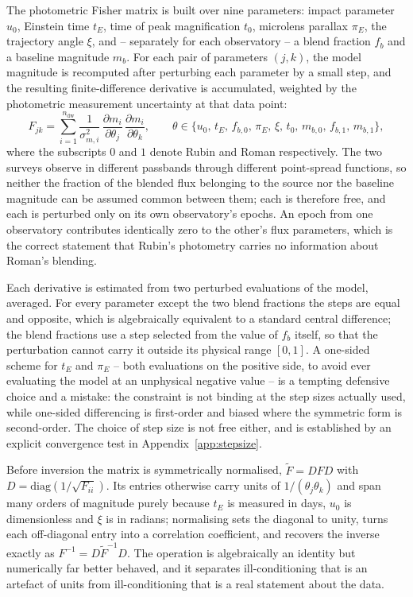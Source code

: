 \documentclass[english,10pt,a4paper]{article}
\begin{document}
	The photometric Fisher matrix is built over nine parameters: impact parameter $u_0$, Einstein time $t_E$, time of peak magnification $t_0$, microlens parallax $\pi_E$, the trajectory angle $\xi$, and -- separately for each observatory -- a blend fraction $f_b$ and a baseline magnitude $m_b$. For each pair of parameters $(j,k)$, the model magnitude is recomputed after perturbing each parameter by a small step, and the resulting finite-difference derivative is accumulated, weighted by the photometric measurement uncertainty at that data point:
	\[
	F_{jk} = \sum_{i=1}^{n_{\mathrm{dw}}} \frac{1}{\sigma_{m,i}^2}\,\frac{\partial m_i}{\partial\theta_j}\,\frac{\partial m_i}{\partial\theta_k}, \qquad \theta \in \{u_0,\, t_E,\, f_{b,0},\, \pi_E,\, \xi,\, t_0,\, m_{b,0},\, f_{b,1},\, m_{b,1}\},
	\]
	where the subscripts $0$ and $1$ denote Rubin and Roman respectively. The two surveys observe in different passbands through different point-spread functions, so neither the fraction of the blended flux belonging to the source nor the baseline magnitude can be assumed common between them; each is therefore free, and each is perturbed only on its own observatory's epochs. An epoch from one observatory contributes identically zero to the other's flux parameters, which is the correct statement that Rubin's photometry carries no information about Roman's blending.
	
	Each derivative is estimated from two perturbed evaluations of the model, averaged. For every parameter except the two blend fractions the steps are equal and opposite, which is algebraically equivalent to a standard central difference; the blend fractions use a step selected from the value of $f_b$ itself, so that the perturbation cannot carry it outside its physical range $[0,1]$. A one-sided scheme for $t_E$ and $\pi_E$ -- both evaluations on the positive side, to avoid ever evaluating the model at an unphysical negative value -- is a tempting defensive choice and a mistake: the constraint is not binding at the step sizes actually used, while one-sided differencing is first-order and biased where the symmetric form is second-order. The choice of step size is not free either, and is established by an explicit convergence test in Appendix~\ref{app:stepsize}.
	
	Before inversion the matrix is symmetrically normalised, $\tilde{F} = D F D$ with $D = \mathrm{diag}(1/\sqrt{F_{ii}})$. Its entries otherwise carry units of $1/(\theta_j\theta_k)$ and span many orders of magnitude purely because $t_E$ is measured in days, $u_0$ is dimensionless and $\xi$ is in radians; normalising sets the diagonal to unity, turns each off-diagonal entry into a correlation coefficient, and recovers the inverse exactly as $F^{-1} = D\tilde{F}^{-1}D$. The operation is algebraically an identity but numerically far better behaved, and it separates ill-conditioning that is an artefact of units from ill-conditioning that is a real statement about the data.
	
\end{document}
